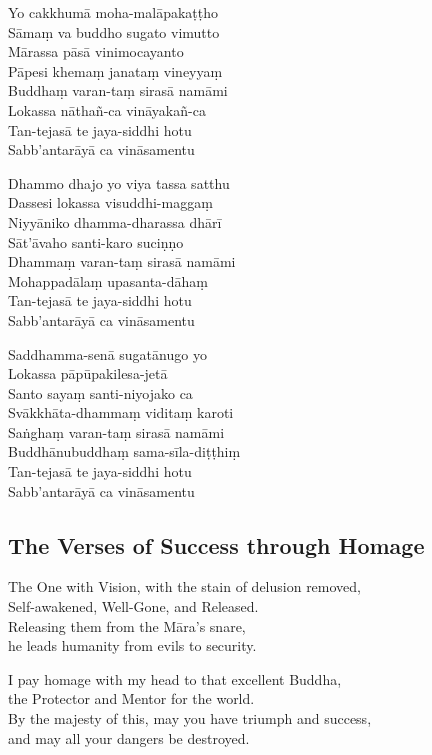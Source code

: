 \begin{paritta}
Yo cakkhumā moha-malāpakaṭṭho\\
Sāmaṃ va buddho sugato vimutto\\
Mārassa pāsā vinimocayanto\\
Pāpesi khemaṃ janataṃ vineyyaṃ\\
Buddhaṃ varan-taṃ sirasā namāmi\\
Lokassa nāthañ-ca vināyakañ-ca\\
Tan-tejasā te jaya-siddhi hotu\\
Sabb'antarāyā ca vināsamentu

Dhammo dhajo yo viya tassa satthu\\
Dassesi lokassa visuddhi-maggaṃ\\
Niyyāniko dhamma-dharassa dhārī\\
Sāt'āvaho santi-karo suciṇṇo\\
Dhammaṃ varan-taṃ sirasā namāmi\\
Mohappadālaṃ upasanta-dāhaṃ\\
Tan-tejasā te jaya-siddhi hotu\\
Sabb'antarāyā ca vināsamentu

Saddhamma-senā sugatānugo yo\\
Lokassa pāpūpakilesa-jetā\\
Santo sayaṃ santi-niyojako ca\\
Svākkhāta-dhammaṃ viditaṃ karoti\\
Saṅghaṃ varan-taṃ sirasā namāmi\\
Buddhānubuddhaṃ sama-sīla-diṭṭhiṃ\\
Tan-tejasā te jaya-siddhi hotu\\
Sabb'antarāyā ca vināsamentu
\end{paritta}

\subsection{The Verses of Success through Homage}


The One with Vision, with the stain of delusion removed,\\
Self-awakened, Well-Gone, and Released.\\
Releasing them from the Māra's snare,\\
he leads humanity from evils to security.

I pay homage with my head to that excellent Buddha,\\
the Protector and Mentor for the world.\\
By the majesty of this, may you have triumph and success,\\
and may all your dangers be destroyed.

